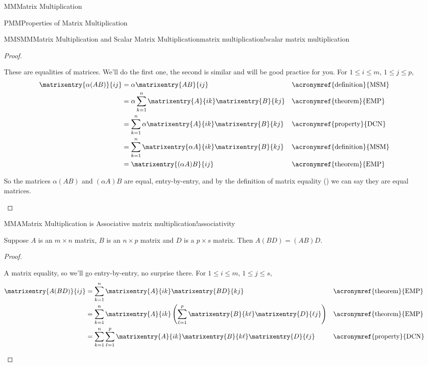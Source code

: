 \begin{subsect}{MM}{Matrix Multiplication}
\begin{subsect}{PMM}{Properties of Matrix Multiplication}
\begin{theorem}{MMSMM}{Matrix Multiplication and Scalar Matrix Multiplication}{matrix multiplication!scalar matrix multiplication}
\end{theorem}
%
\begin{proof}
\begin{para}These are equalities of matrices.  We'll do the first one, the second is similar and will be good practice for you.    For $1\leq i\leq m$, $1\leq j\leq p$,
%
\begin{align*}
\matrixentry{\alpha(AB)}{ij}
&=\alpha\matrixentry{AB}{ij}&&\text{\acronymref{definition}{MSM}}\\
&=\alpha\sum_{k=1}^{n}\matrixentry{A}{ik}\matrixentry{B}{kj}&&\text{\acronymref{theorem}{EMP}}\\
&=\sum_{k=1}^{n}\alpha\matrixentry{A}{ik}\matrixentry{B}{kj}&&\text{\acronymref{property}{DCN}}\\
&=\sum_{k=1}^{n}\matrixentry{\alpha A}{ik}\matrixentry{B}{kj}&&\text{\acronymref{definition}{MSM}}\\
&=\matrixentry{(\alpha A)B}{ij}&&\text{\acronymref{theorem}{EMP}}
\end{align*}\end{para}
%
\begin{para}So the matrices $\alpha(AB)$ and $(\alpha A)B$ are equal, entry-by-entry, and by the definition of matrix equality () we can say they are equal matrices.\end{para}
%
\end{proof}
%
\begin{theorem}{MMA}{Matrix Multiplication is Associative }{matrix multiplication!associativity}
\begin{para}Suppose $A$ is an $m\times n$ matrix, $B$ is an $n\times p$ matrix and $D$ is a $p\times s$ matrix.  Then  $A(BD)=(AB)D$.\end{para}
\end{theorem}
%
\begin{proof}
\begin{para}A matrix equality, so we'll go entry-by-entry, no surprise there.    For $1\leq i\leq m$, $1\leq j\leq s$,
%
\begin{align*}
\matrixentry{A(BD)}{ij}
&=\sum_{k=1}^{n}\matrixentry{A}{ik}\matrixentry{BD}{kj}
&&\text{\acronymref{theorem}{EMP}}\\
&=\sum_{k=1}^{n}\matrixentry{A}{ik}\left(\sum_{\ell=1}^{p}\matrixentry{B}{k\ell}\matrixentry{D}{\ell j}\right)
&&\text{\acronymref{theorem}{EMP}}\\
&=\sum_{k=1}^{n}\sum_{\ell=1}^{p}\matrixentry{A}{ik}\matrixentry{B}{k\ell}\matrixentry{D}{\ell j}
&&\text{\acronymref{property}{DCN}}\\

\end{align*}
\end{para}
\end{proof}
\end{subsect}
\end{subsect}
